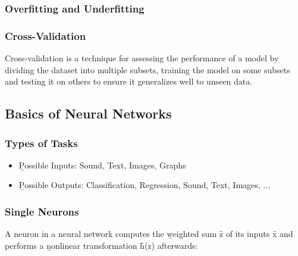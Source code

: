 \subsubsection{Overfitting and Underfitting}

\subsubsection{Cross-Validation}
Cross-validation is a technique for assessing the performance of a model by dividing the dataset into multiple subsets, training the model on some subsets and testing it on others to ensure it generalizes well to unseen data.

\subsection{Basics of Neural Networks}
\subsubsection{Types of Tasks}
\begin{itemize}
    \item \b{Possible Inputs:} Sound, Text, Images, Graphs
    \item \b{Possible Outputs:} Classification, Regression, Sound, Text, Images, ... 
\end{itemize}

\subsubsection{Single Neurons}
A neuron in a neural network computes the \b{weighted sum \f{z} of its inputs \f{x}} and performs a \b{nonlinear transformation} \f{h(z)} afterwards:
